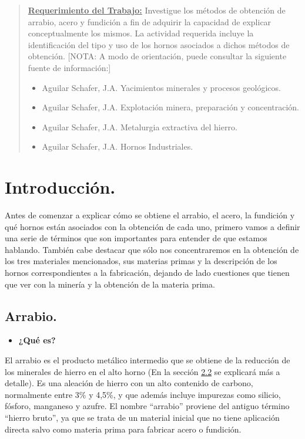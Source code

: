 \documentclass[12pt,a4paper]{article}
\begin{document}

\tableofcontents

\begin{abstract}
    \underline{\textbf{Requerimiento del Trabajo:}} Investigue los métodos de obtención de arrabio, acero y fundición a fin de adquirir la capacidad de explicar conceptualmente los mismos. La actividad requerida incluye la identificación del tipo y uso de los hornos asociados a dichos métodos de obtención. [NOTA: A modo de orientación, puede consultar la siguiente fuente de información:]
    \begin{itemize}
        \item Aguilar Schafer, J.A. Yacimientos minerales y procesos geológicos.
        \item Aguilar Schafer, J.A. Explotación minera, preparación y concentración.
        \item Aguilar Schafer, J.A. Metalurgia extractiva del hierro.
        \item Aguilar Schafer, J.A. Hornos Industriales.
    \end{itemize}
\end{abstract}

\section{Introducción.}
Antes de comenzar a explicar cómo se obtiene el arrabio, el acero, la fundición y qué hornos están asociados con la obtención de cada uno, primero vamos a definir una serie de términos que son importantes para entender de que estamos hablando. También cabe destacar que sólo nos concentraremos en la obtención de los tres materiales mencionados, sus materias primas y la descripción de los hornos correspondientes a la fabricación, dejando de lado cuestiones que tienen que ver con la minería y la obtención de la materia prima.

\subsection{Arrabio.}
\begin{itemize}
    \item \textbf{¿Qué es?}
\end{itemize}

El arrabio es el producto metálico intermedio que se obtiene de la reducción de los minerales de hierro en el alto horno (En la sección \hyperref[alto_horno]{2.2} se explicará más a detalle). Es una aleación de hierro con un alto contenido de carbono, normalmente entre 3\% y 4,5\%, y que además incluye impurezas como silicio, fósforo, manganeso y azufre. El nombre “arrabio” proviene del antiguo término “hierro bruto”, ya que se trata de un material inicial que no tiene aplicación directa salvo como materia prima para fabricar acero o fundición.
\end{document}

